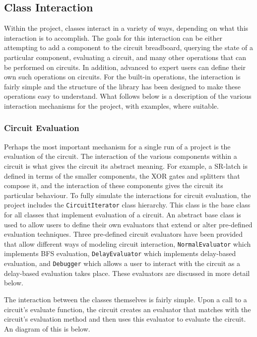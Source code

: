 \documentclass{article}
\newcommand{\ClassName}[1]{\texttt{#1}}
\begin{document}
\subsection{Class Interaction}

Within the project, classes interact in a variety of ways, depending on what this interaction is to accomplish. The goals for this interaction can be either attempting to add a component to the circuit breadboard, querying the state of a particular component, evaluating a circuit, and many other operations that can be performed on circuits. In addition, advanced to expert users can define their own such operations on circuits. For the built-in operations, the interaction is fairly simple and the structure of the library has been designed to make these operations easy to understand. What follows below is a description of the various interaction mechanisms for the project, with examples, where suitable.

\subsubsection{Circuit Evaluation}

Perhaps the most important mechanism for a single run of a project is the evaluation of the circuit. The interaction of the various components within a circuit is what gives the circuit its abstract meaning. For example, a SR-latch is defined in terms of the smaller components, the XOR gates and splitters that compose it, and the interaction of these components gives the circuit its particular behaviour. To fully simulate the interactions for circuit evaluation, the project includes the \ClassName{CircuitIterator} class hierarchy. This class is the base class for all classes that implement evaluation of a circuit.  An abstract base class is used to allow users to define their own evaluators that extend or alter pre-defined evaluation techniques. Three pre-defined circuit evaluators have been provided that allow different ways of modeling circuit interaction, \ClassName{NormalEvaluator} which implements BFS evaluation, \ClassName{DelayEvaluator} which implements delay-based evaluation, and \ClassName{Debugger} which allows a user to interact with the circuit as a delay-based evaluation takes place. These evaluators are discussed in more detail below.

The interaction between the classes themselves is fairly simple. Upon a call to a circuit’s evaluate function, the circuit creates an evaluator that matches with the circuit’s evaluation method and then uses this evaluator to evaluate the circuit. An diagram of this is below.
\end{document}
